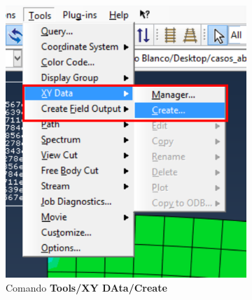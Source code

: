 \begin{enumerate}
\begin{figure}[H]
  \centering
  \begin{subfigure}{0.30\textwidth}
    \includegraphics[width=\textwidth]{./body/images/imagen104.pdf}
    \caption{Comando \textbf{Tools/XY DAta/Create} }
    \label{figu104}
  \end{subfigure}%
  ~ %
  \begin{subfigure}{0.30\textwidth}

\end{subfigure}
\end{figure}
\end{enumerate}
